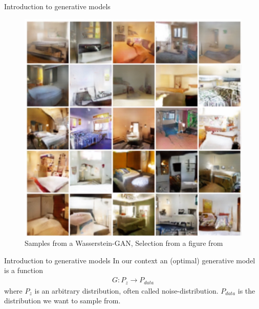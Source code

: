\documentclass[18pt]{beamer}
\begin{document}
\begin{frame}{Introduction to generative models}
\begin{figure}[h]
    \centering
    \includegraphics[width=1\textwidth,height=0.6\textheight,keepaspectratio]{wasserstein_examples_crop}
    \caption{Samples from a Wasserstein-GAN, Selection from a figure from \cite{ArjovskyCB17}}
\end{figure}
\end{frame}

\begin{frame}{Introduction to generative models}
In our context an (optimal) generative model is a function
\begin{align*}
    G : P_{z} \to P_{data}
\end{align*}
where $P_{z}$ is an arbitrary distribution, often called noise-distribution. %
$P_{data}$ is the distribution we want to sample from.
\end{frame}
\end{document}
